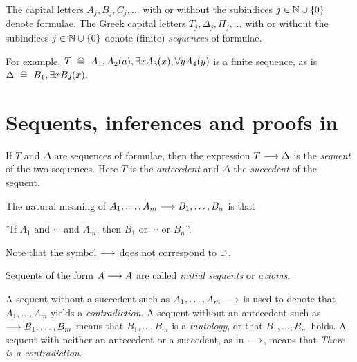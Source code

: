 \documentclass[11pt,a4paper]{article}
\begin{document}
\begin{definition}
    The capital letters \(A_j, B_j, C_j, \ldots\) with or without the subindices \(j \in \mathbb{N}\cup\{0\}\) denote formulae.
    The Greek capital letters \(T_j, \Delta_j, \Pi_j,\ldots\) with or without the subindices \(j\in\mathbb{N}\cup\{0\}\)
    denote (finite) \emph{sequences} of formulae.
    \label{def:alphabet of formulae}
\end{definition}

For example, \(T\corr A_1, A_2(a), \exists x A_3(x), \forall y A_4(y)\) is a finite sequence,
as is \(\Delta \corr B_1, \exists x B_2(x)\).


\section{Sequents, inferences and proofs in \LK}

\begin{definition}%
    \label{def:sequent}
    If \(T\) and \(\Delta\) are sequences of formulae,
    then the expression \(T\longrightarrow\Delta\) is the \emph{sequent} of the two sequences.
    Here \(T\) is the \emph{antecedent} and \(\Delta\) the \emph{succedent}
    of the sequent.
\end{definition}

The natural meaning of \(A_1, \ldots,A_m\longrightarrow B_1,\ldots,B_n\) is that
\begin{center}
''If \(A_1\) and \(\cdots\) and \(A_m\), then \(B_1\) or \(\cdots\) or \(B_n\)''.
\end{center}
Note that the symbol \(\longrightarrow\) does not correspond to \(\supset\).

\begin{definition}[Axioms]%
    \label{def:axiom}
    Sequents of the form \(A\longrightarrow A\) are called \emph{initial sequents} or \emph{axioms}.
\end{definition}

\begin{definition}%
    \label{def:contradiction and tautology}
    A sequent without a succedent such as \(A_1, \ldots,A_m\longrightarrow\)
    is used to denote that \(A_1, \ldots,A_m\) yields a \emph{contradiction}.
    A sequent without an antecedent such as \(\longrightarrow B_1,\ldots,B_m\) means that
    \(B_1,\ldots,B_m\) is a \emph{tautology}, or that \(B_1,\ldots,B_m\) holds.
    A sequent with neither an antecedent or a succedent, as in \(\longrightarrow\),
    means that \emph{There is a contradiction}.
\end{definition}
\end{document}
